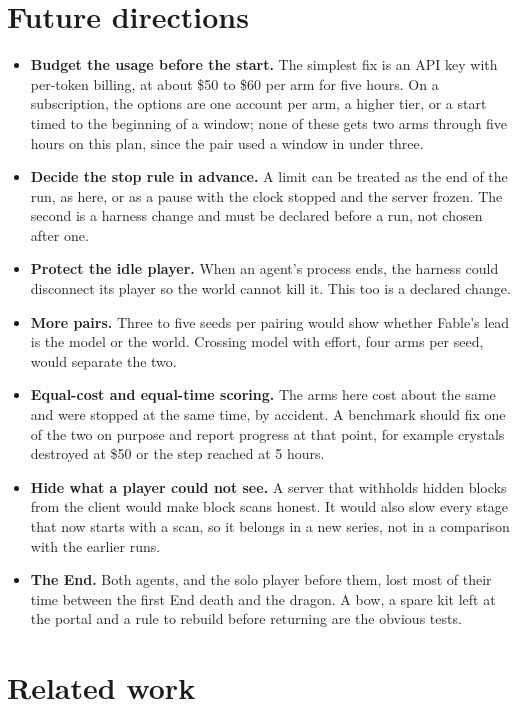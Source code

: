 \documentclass[11pt,a4paper]{article}
\begin{document}
\section{Future directions}
\label{sec:future}

\begin{itemize}
\item \textbf{Budget the usage before the start.} The simplest fix is an API key with per-token billing, at about \$50 to \$60 per arm for five hours. On a subscription, the options are one account per arm, a higher tier, or a start timed to the beginning of a window; none of these gets two arms through five hours on this plan, since the pair used a window in under three.
\item \textbf{Decide the stop rule in advance.} A limit can be treated as the end of the run, as here, or as a pause with the clock stopped and the server frozen. The second is a harness change and must be declared before a run, not chosen after one.
\item \textbf{Protect the idle player.} When an agent's process ends, the harness could disconnect its player so the world cannot kill it. This too is a declared change.
\item \textbf{More pairs.} Three to five seeds per pairing would show whether Fable's lead is the model or the world. Crossing model with effort, four arms per seed, would separate the two.
\item \textbf{Equal-cost and equal-time scoring.} The arms here cost about the same and were stopped at the same time, by accident. A benchmark should fix one of the two on purpose and report progress at that point, for example crystals destroyed at \$50 or the step reached at 5 hours.
\item \textbf{Hide what a player could not see.} A server that withholds hidden blocks from the client would make block scans honest. It would also slow every stage that now starts with a scan, so it belongs in a new series, not in a comparison with the earlier runs.
\item \textbf{The End.} Both agents, and the solo player before them, lost most of their time between the first End death and the dragon. A bow, a spare kit left at the portal and a rule to rebuild before returning are the obvious tests.
\end{itemize}

\section{Related work}
\end{document}
